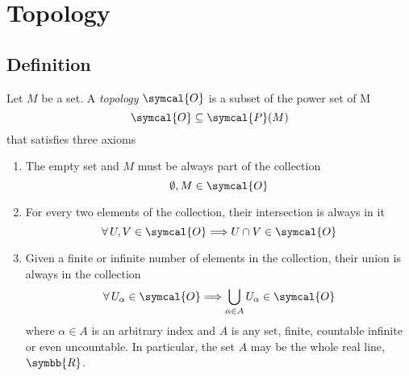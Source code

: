 \section{Topology}
\subsection{Definition}
Let $M$ be a set. A \emph{topology}\footnotemark{} $\symcal{O}$ is a subset of
the power set of M
\begin{equation}
  \symcal{O} \subseteq \symcal{P}(M)
\end{equation}
that satisfies three axioms
\begin{enumerate}
\item The empty set and $M$ must be always part of the collection
  \begin{equation}
    \emptyset , M \in \symcal{O}
  \end{equation}
 
\item For every two elements of the collection, their intersection is always in
  it
  \begin{equation}
    \forall\, U, V \in\symcal{O}  \Longrightarrow U \cap V \in \symcal{O}
  \end{equation}
  
\item Given a finite or infinite number of elements in the collection, their
  union is always in the collection
  \begin{equation}
    \forall\, U_\alpha \in \symcal{O}  \Longrightarrow \bigcup_{\alpha\in A}
    U_\alpha \in \symcal{O}
  \end{equation}
  where $\alpha \in A$ is an arbitrary index and $A$ is any set, finite,
  countable infinite or even uncountable. In particular, the set $A$ may be the
  whole real line, $\symbb{R}$.
\end{enumerate}

